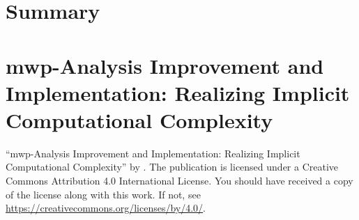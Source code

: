 \chapter{Summary}\label{ch:summary}


\backmatter
\printbibliography[label=chap:references, title=References]
\let\printbibliography\relax

\appendix

\chapter{mwp-Analysis Improvement and Implementation: Realizing Implicit Computational Complexity}\label{app:sec:fscd}
{\newline\enquote{mwp-Analysis Improvement and Implementation: Realizing Implicit Computational Complexity} \textcopyright{ }by{ }\CTNT.
The publication is licensed under a Creative Commons Attribution 4.0 International License.
You should have received a copy of the license along with this work.
If not, see \url{https://creativecommons.org/licenses/by/4.0/}.}

